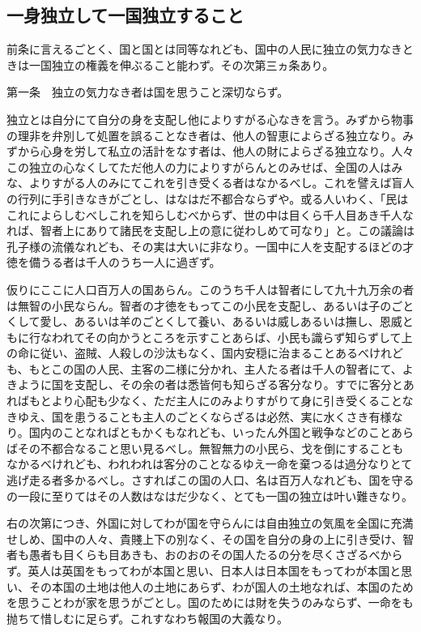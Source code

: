 \documentclass[a4paper, platex, dvipdfmx]{jsarticle}
\begin{document}
\subsection{一身独立して一国独立すること}
前条に言えるごとく、国と国とは同等なれども、国中の人民に独立の気力なきときは一国独立の権義を伸ぶること能わず。その次第三ヵ条あり。

第一条　独立の気力なき者は国を思うこと深切ならず。

独立とは自分にて自分の身を支配し他によりすがる心なきを言う。みずから物事の理非を弁別して処置を誤ることなき者は、他人の智恵によらざる独立なり。みずから心身を労して私立の活計をなす者は、他人の財によらざる独立なり。人々この独立の心なくしてただ他人の力によりすがらんとのみせば、全国の人はみな、よりすがる人のみにてこれを引き受くる者はなかるべし。これを譬えば盲人の行列に手引きなきがごとし、はなはだ不都合ならずや。或る人いわく、「民はこれによらしむべしこれを知らしむべからず、世の中は目くら千人目あき千人なれば、智者上にありて諸民を支配し上の意に従わしめて可なり」と。この議論は孔子様の流儀なれども、その実は大いに非なり。一国中に人を支配するほどの才徳を備うる者は千人のうち一人に過ぎず。

仮りにここに人口百万人の国あらん。このうち千人は智者にして九十九万余の者は無智の小民ならん。智者の才徳をもってこの小民を支配し、あるいは子のごとくして愛し、あるいは羊のごとくして養い、あるいは威しあるいは撫し、恩威ともに行なわれてその向かうところを示すことあらば、小民も識らず知らずして上の命に従い、盗賊、人殺しの沙汰もなく、国内安穏に治まることあるべけれども、もとこの国の人民、主客の二様に分かれ、主人たる者は千人の智者にて、よきように国を支配し、その余の者は悉皆何も知らざる客分なり。すでに客分とあればもとより心配も少なく、ただ主人にのみよりすがりて身に引き受くることなきゆえ、国を患うることも主人のごとくならざるは必然、実に水くさき有様なり。国内のことなればともかくもなれども、いったん外国と戦争などのことあらばその不都合なること思い見るべし。無智無力の小民ら、戈を倒にすることもなかるべけれども、われわれは客分のことなるゆえ一命を棄つるは過分なりとて逃げ走る者多かるべし。さすればこの国の人口、名は百万人なれども、国を守るの一段に至りてはその人数はなはだ少なく、とても一国の独立は叶い難きなり。

右の次第につき、外国に対してわが国を守らんには自由独立の気風を全国に充満せしめ、国中の人々、貴賤上下の別なく、その国を自分の身の上に引き受け、智者も愚者も目くらも目あきも、おのおのその国人たるの分を尽くさざるべからず。英人は英国をもってわが本国と思い、日本人は日本国をもってわが本国と思い、その本国の土地は他人の土地にあらず、わが国人の土地なれば、本国のためを思うことわが家を思うがごとし。国のためには財を失うのみならず、一命をも抛ちて惜しむに足らず。これすなわち報国の大義なり。
\end{document}
